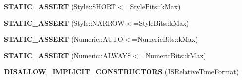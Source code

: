 \begin{DoxyCompactItemize}
{\bfseries S\+T\+A\+T\+I\+C\+\_\+\+A\+S\+S\+E\+RT} (Style\+::\+S\+H\+O\+RT$<$=Style\+Bits\+::k\+Max)
\item 
\mbox{\label{classv8_1_1internal_1_1JSRelativeTimeFormat_ab56c26da5436c3732b12124536a97209}} 
{\bfseries S\+T\+A\+T\+I\+C\+\_\+\+A\+S\+S\+E\+RT} (Style\+::\+N\+A\+R\+R\+OW$<$=Style\+Bits\+::k\+Max)
\item 
\mbox{\label{classv8_1_1internal_1_1JSRelativeTimeFormat_af5581f853d5f029a47dd36a6eb2b8af8}} 
{\bfseries S\+T\+A\+T\+I\+C\+\_\+\+A\+S\+S\+E\+RT} (Numeric\+::\+A\+U\+TO$<$=Numeric\+Bits\+::k\+Max)
\item 
\mbox{\label{classv8_1_1internal_1_1JSRelativeTimeFormat_a2ee6025171e78867e0980e1986c6bdc1}} 
{\bfseries S\+T\+A\+T\+I\+C\+\_\+\+A\+S\+S\+E\+RT} (Numeric\+::\+A\+L\+W\+A\+YS$<$=Numeric\+Bits\+::k\+Max)
\item 
\mbox{\label{classv8_1_1internal_1_1JSRelativeTimeFormat_a123efbd07372529b0645ef759cd4270c}} 
{\bfseries D\+I\+S\+A\+L\+L\+O\+W\+\_\+\+I\+M\+P\+L\+I\+C\+I\+T\+\_\+\+C\+O\+N\+S\+T\+R\+U\+C\+T\+O\+RS} (\mbox{\hyperlink{classv8_1_1internal_1_1JSRelativeTimeFormat}{J\+S\+Relative\+Time\+Format}})
\end{DoxyCompactItemize}
